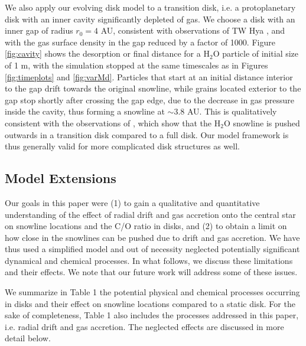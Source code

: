 \documentclass[apj]{emulateapj}
\begin{document}
We also apply our evolving disk model to a transition disk, i.e. a protoplanetary disk with an inner cavity significantly depleted of gas. We choose a disk with an inner gap of radius $r_0=4$ AU, consistent with observations of TW Hya \citep{zhang13}, and with the gas surface density in the gap reduced by a factor of 1000. Figure \ref{fig:cavity} shows the desorption or final distance for a H$_2$O particle of initial size of 1 m, with the simulation stopped at the same timescales as in Figures \ref{fig:timeplots} and \ref{fig:varMd}. Particles that start at an initial distance interior to the gap drift towards the original snowline, while grains located exterior to the gap stop shortly after crossing the gap edge, due to the decrease in gas pressure inside the cavity, thus forming a snowline at $\sim$$3.8$ AU. This is qualitatively consistent with the observations of \citet{zhang13}, which show that the H$_2$O snowline is pushed outwards in a transition disk compared to a full disk. Our model framework is thus generally valid for more complicated disk structures as well.  




\subsection{Model Extensions}
\label{sec:neglected}

Our goals in this paper were (1) to gain a qualitative and quantitative understanding of the effect of radial drift and gas accretion onto the central star on snowline locations and the C/O ratio in disks, and (2) to obtain a limit on how close in the snowlines can be pushed due to drift and gas accretion. We have thus used a simplified model and out of necessity neglected potentially significant dynamical and chemical processes. In what follows, we discuss these limitations and their effects. We note that our future work will address some of these issues. 




We summarize in Table 1 the potential physical and chemical processes occurring in disks and their effect on snowline locations compared to a static disk. For the sake of completeness, Table 1 also includes the processes addressed in this paper, i.e. radial drift and gas accretion. The neglected effects are discussed in more detail below. 
\end{document}

